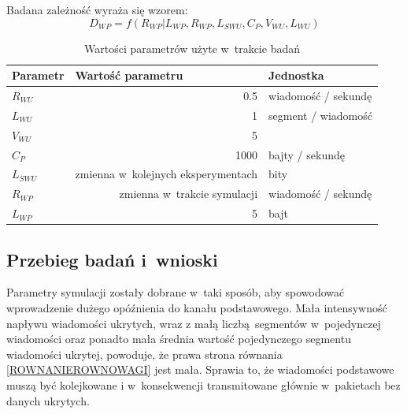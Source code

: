 \documentclass[a4paper, twoside, 12pt]{report}
\begin{document}
            Badana zależność wyraża się wzorem: \\
                $$ D_{WP} = f(R_{WP} | L_{WP}, R_{WP}, L_{SWU}, C_P, V_{WU}, L_{WU}) $$
            \begin{table}[h]
                \centering
                \begin{tabular}{ | l | r | l | }
                    \hline
                    {\bfseries Parametr} & \multicolumn{1}{|l|}{{\bfseries Wartość parametru}} & {\bfseries Jednostka} \\ \hline
                    \( R_{WU} \) & 0.5 & wiadomość / sekundę \\ \hline
                    \( L_{WU} \) & 1 & segment / wiadomość \\ \hline
                    \( V_{WU} \) & 5 & \\ \hline
                    \( C_P \) & 1000 & bajty / sekundę \\ \hline
                    \( L_{SWU} \) & zmienna w~kolejnych eksperymentach & bity \\ \hline
                    \( R_{WP} \) & zmienna w~trakcie symulacji & wiadomość / sekundę  \\ \hline
                    \( L_{WP} \) & 5 & bajt \\ \hline
                \end{tabular}
                \caption{Wartości parametrów użyte w~trakcie badań}
            \end{table}
        \subsection{Przebieg badań i~wnioski}
            Parametry symulacji zostały dobrane w~taki sposób, aby spowodować
            wprowadzenie dużego opóźnienia do kanału podstawowego. Mała intensywność
            napływu wiadomości ukrytych, wraz z małą liczbą segmentów w~pojedynczej
            wiadomości oraz ponadto mała średnia wartość pojedynczego segmentu
            wiadomości ukrytej, powoduje, że prawa strona równania \ref{ROWNANIEROWNOWAGI}
            jest mała. Sprawia to, że wiadomości podstawowe muszą być kolejkowane i
            w~konsekwencji transmitowane głównie w~pakietach bez danych ukrytych.
\end{document}
